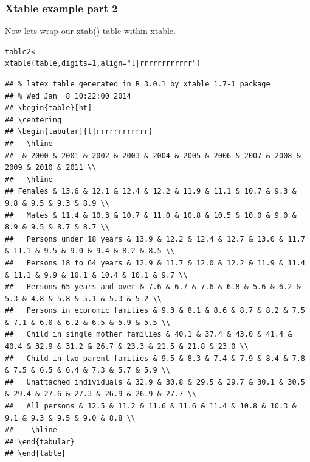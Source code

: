 \documentclass[nogin]{beamer}\usepackage[]{graphicx}\usepackage[]{color}
\makeatletter
\newenvironment{kframe}{%
 \def\at@end@of@kframe{}%
 \ifinner\ifhmode%
  \def\at@end@of@kframe{\end{minipage}}%
  \begin{minipage}{\columnwidth}%
 \fi\fi%
 \def\FrameCommand##1{\hskip\@totalleftmargin \hskip-\fboxsep
 \colorbox{shadecolor}{##1}\hskip-\fboxsep
     \hskip-\linewidth \hskip-\@totalleftmargin \hskip\columnwidth}%
 \MakeFramed {\advance\hsize-\width
   \@totalleftmargin\z@ \linewidth\hsize
   \@setminipage}}%
 {\par\unskip\endMakeFramed%
 \at@end@of@kframe}
\newenvironment{knitrout}{}{} %
\makeatother
\begin{document}
\begin{frame}[fragile]
\frametitle{Xtable example part 2}
Now lets wrap our xtab() table within xtable.
\begin{verbatim}
table2<-
xtable(table,digits=1,align="l|rrrrrrrrrrrr")
\end{verbatim}
\begin{knitrout}
\color{fgcolor}\begin{kframe}
\begin{verbatim}
## % latex table generated in R 3.0.1 by xtable 1.7-1 package
## % Wed Jan  8 10:22:00 2014
## \begin{table}[ht]
## \centering
## \begin{tabular}{l|rrrrrrrrrrrr}
##   \hline
##  & 2000 & 2001 & 2002 & 2003 & 2004 & 2005 & 2006 & 2007 & 2008 & 2009 & 2010 & 2011 \\ 
##   \hline
## Females & 13.6 & 12.1 & 12.4 & 12.2 & 11.9 & 11.1 & 10.7 & 9.3 & 9.8 & 9.5 & 9.3 & 8.9 \\ 
##   Males & 11.4 & 10.3 & 10.7 & 11.0 & 10.8 & 10.5 & 10.0 & 9.0 & 8.9 & 9.5 & 8.7 & 8.7 \\ 
##   Persons under 18 years & 13.9 & 12.2 & 12.4 & 12.7 & 13.0 & 11.7 & 11.1 & 9.5 & 9.0 & 9.4 & 8.2 & 8.5 \\ 
##   Persons 18 to 64 years & 12.9 & 11.7 & 12.0 & 12.2 & 11.9 & 11.4 & 11.1 & 9.9 & 10.1 & 10.4 & 10.1 & 9.7 \\ 
##   Persons 65 years and over & 7.6 & 6.7 & 7.6 & 6.8 & 5.6 & 6.2 & 5.3 & 4.8 & 5.8 & 5.1 & 5.3 & 5.2 \\ 
##   Persons in economic families & 9.3 & 8.1 & 8.6 & 8.7 & 8.2 & 7.5 & 7.1 & 6.0 & 6.2 & 6.5 & 5.9 & 5.5 \\ 
##   Child in single mother families & 40.1 & 37.4 & 43.0 & 41.4 & 40.4 & 32.9 & 31.2 & 26.7 & 23.3 & 21.5 & 21.8 & 23.0 \\ 
##   Child in two-parent families & 9.5 & 8.3 & 7.4 & 7.9 & 8.4 & 7.8 & 7.5 & 6.5 & 6.4 & 7.3 & 5.7 & 5.9 \\ 
##   Unattached individuals & 32.9 & 30.8 & 29.5 & 29.7 & 30.1 & 30.5 & 29.4 & 27.6 & 27.3 & 26.9 & 26.9 & 27.7 \\ 
##   All persons & 12.5 & 11.2 & 11.6 & 11.6 & 11.4 & 10.8 & 10.3 & 9.1 & 9.3 & 9.5 & 9.0 & 8.8 \\ 
##    \hline
## \end{tabular}
## \end{table}
\end{verbatim}
\end{kframe}
\end{knitrout}

\end{frame}
\end{document}
